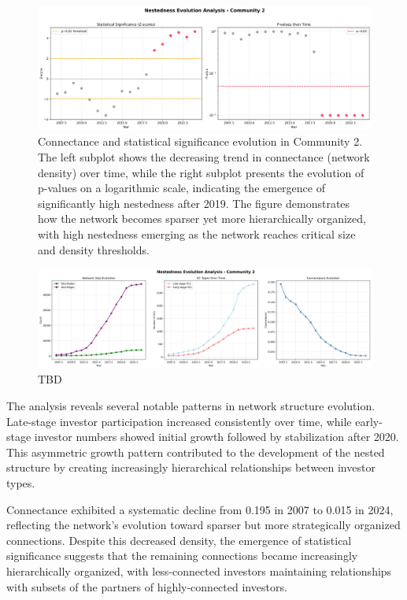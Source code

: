 \begin{figure}[htbp]
\hspace*{-1cm}\centering
\includegraphics[width=1.2\textwidth]{../figures/us/nestedness_evolution_community_2_pt2.png}
\caption{Connectance and statistical significance evolution in Community 2. The left subplot shows the decreasing trend in connectance (network density) over time, while the right subplot presents the evolution of p-values on a logarithmic scale, indicating the emergence of significantly high nestedness after 2019. The figure demonstrates how the network becomes sparser yet more hierarchically organized, with high nestedness emerging as the network reaches critical size and density thresholds.}
\label{fig:connectance_evolution}
\end{figure}

\begin{figure}[htbp]
\hspace*{-1cm}\centering
\includegraphics[width=1.2\textwidth]{../figures/us/nestedness_evolution_community_2_pt3.png}
\caption{TBD}
\label{fig:connectance_evolution}
\end{figure}

The analysis reveals several notable patterns in network structure evolution. Late-stage investor participation increased consistently over time, while early-stage investor numbers showed initial growth followed by stabilization after 2020. This asymmetric growth pattern contributed to the development of the nested structure by creating increasingly hierarchical relationships between investor types.

Connectance exhibited a systematic decline from 0.195 in 2007 to 0.015 in 2024, reflecting the network's evolution toward sparser but more strategically organized connections. Despite this decreased density, the emergence of statistical significance suggests that the remaining connections became increasingly hierarchically organized, with less-connected investors maintaining relationships with subsets of the partners of highly-connected investors.

